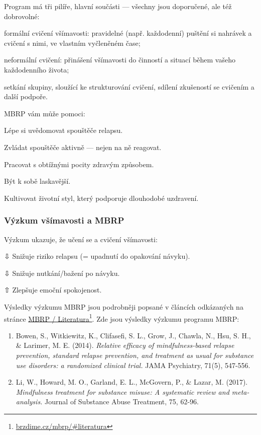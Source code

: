 	Program má tři pilíře, hlavní součásti — všechny jsou doporučené, ale též dobrovolné:
	\begin{description*}
		\item[formální cvičení všímavosti:] pravidelné (např. každodenní) puštění si nahrávek a cvičení s nimi, ve vlastním vyčleněném čase;
		\item[neformální cvičení:] přinášení všímavosti do činností a situací během vašeho každodenního života;
		\item[setkání skupiny,] sloužící ke strukturování cvičení, sdílení zkušeností se cvičením a další podpoře.
	\end{description*}

	MBRP vám může pomoci:
	\begin{itemize*}
		\item Lépe si uvědomovat spouštěče relapsu.
		\item Zvládat spouštěče aktivně — nejen na ně reagovat.
		\item Pracovat s obtížnými pocity zdravým způsobem.
		\item Být k sobě laskavější.
		\item Kultivovat životní styl, který podporuje dlouhodobé uzdravení.
	\end{itemize*}


	\subsubsection*{Výzkum všímavosti a MBRP}
		Výzkum ukazuje, že učení se a cvičení všímavosti:
			\begin{itemize*}
				\item[⇩] Snižuje riziko relapsu (= upadnutí do opakování návyku).
				\item[⇩] Snižuje nutkání/bažení po návyku.
				\item[⇧] Zlepšuje emoční spokojenost.
			\end{itemize*}
		Výsledky výzkumu MBRP jsou podrobněji popsané v článcích odkázaných na stránce \href{https://brzdime.cz/mbrp/\#literatura}{MBRP / Literatura}\footnote{\href{https://brzdime.cz/mbrp/\#literatura}{brzdime.cz/mbrp/\#literatura}}.
		Zde jsou výsledky výzkumu programu MBRP:
		\begin{enumerate}
			\item Bowen, S., Witkiewitz, K., Clifasefi, S. L., Grow, J., Chawla, N., Hsu, S. H., \& Larimer, M. E. (2014). \emph{Relative efficacy of mindfulness-based relapse prevention, standard relapse prevention, and treatment as usual for substance use disorders: a randomized clinical trial.} JAMA Psychiatry, 71(5), 547-556.
			\item Li, W., Howard, M. O., Garland, E. L., McGovern, P., \& Lazar, M. (2017). \emph{Mindfulness treatment for substance misuse: A systematic review and meta-analysis.} Journal of Substance Abuse Treatment, 75, 62-96.
		\end{enumerate}


